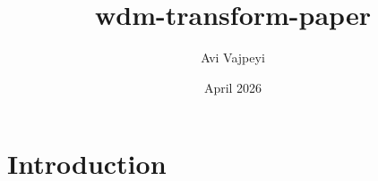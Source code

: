 \documentclass{article}
\title{wdm-transform-paper}
\author{Avi Vajpeyi}
\date{April 2026}
\begin{document}
\maketitle

\section{Introduction}
\end{document}
